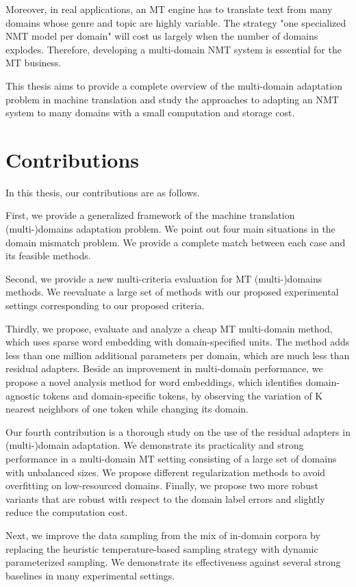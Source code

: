 Moreover, in real applications, an MT engine has to translate text from many domains whose genre and topic are highly variable. The strategy "one specialized NMT model per domain" will cost us largely when the number of domains explodes. Therefore, developing a multi-domain NMT system is essential for the MT business.

This thesis aims to provide a complete overview of the multi-domain adaptation problem in machine translation and study the approaches to adapting an NMT system to many domains with a small computation and storage cost.

\section{Contributions}
In this thesis, our contributions are as follows.

First, we provide a generalized framework of the machine translation (multi-)domains adaptation problem. We point out four main situations in the domain mismatch problem. We provide a complete match between each case and its feasible methods.

Second, we provide a new multi-criteria evaluation for MT (multi-)domains methods. We reevaluate a large set of methods with our proposed experimental settings corresponding to our proposed criteria.

Thirdly, we propose, evaluate and analyze a cheap MT multi-domain method, which uses sparse word embedding with domain-specified units. The method adds less than one million additional parameters per domain, which are much less than residual adapters. Beside an improvement in multi-domain performance, we propose a novel analysis method for word embeddings, which identifies domain-agnostic tokens and domain-specific tokens, by observing the variation of K nearest neighbors of one token while changing its domain.

Our fourth contribution is a thorough study on the use of the residual adapters in (multi-)domain adaptation. We demonstrate its practicality and strong performance in a multi-domain MT setting consisting of a large set of domains with unbalanced sizes. We propose different regularization methods to avoid overfitting on low-resourced domains. Finally, we propose two more robust variants that are robust with respect to the domain label errors and slightly reduce the computation cost.

Next, we improve the data sampling from the mix of in-domain corpora by replacing the heuristic temperature-based sampling strategy with dynamic parameterized sampling. We demonstrate its effectiveness against several strong baselines in many experimental settings.

